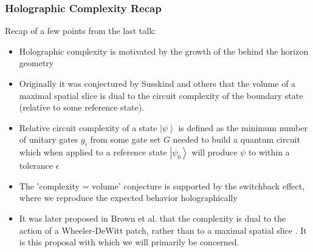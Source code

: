 \documentclass[8pt,aspectratio=169]{beamer}
\newcommand{\ket}[1]{\left| #1 \right>}
\begin{document}
\begin{frame}
\frametitle{Holographic Complexity Recap}

Recap of a few points from the last talk:

\begin{itemize}

\item Holographic complexity is motivated by the growth of the behind the horizon geometry \cite{Susskind:2014moa}

\item Originally it was conjectured by Susskind and others \cite{Susskind:2014moa, Susskind:2014rva} that the volume of a maximal spatial slice is dual to the circuit complexity of the boundary state (relative to some reference state).

\item Relative circuit complexity of a state $\ket{\psi}$ is defined as the minimum number of unitary gates $g_i$ from some gate set $G$ needed to build a quantum circuit which when applied to a reference state $\ket{\psi_0}$ will produce $\psi$ to within a tolerance $\epsilon$

\item The 'complexity = volume' conjecture is supported by the switchback effect, where we reproduce the expected behavior holographically \cite{Stanford:2014jda, Susskind:2014jwa}

\item It was later proposed in Brown et al. that the complexity is dual to the action of a Wheeler-DeWitt patch, rather than to a maximal spatial slice \cite{Brown:2015bva, Brown:2015lvg}. It is this proposal with which we will primarily be concerned.

\end{itemize}

\end{frame}
\end{document}
